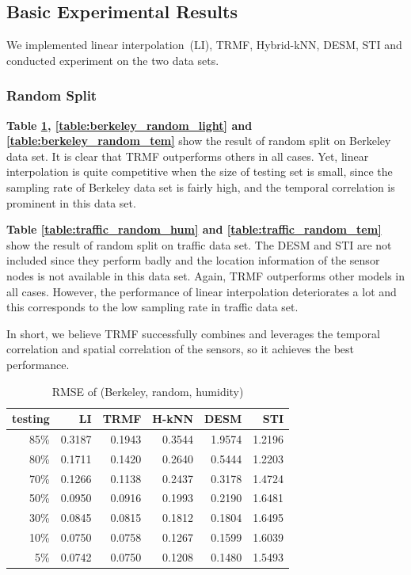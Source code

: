 \subsection{Basic Experimental Results} %

We implemented linear interpolation~(LI), TRMF, Hybrid-kNN, DESM, STI and conducted experiment on the two data sets.

\subsubsection{Random Split}
\textbf{Table \ref{table:berkeley_random_hum}, \ref{table:berkeley_random_light} and \ref{table:berkeley_random_tem}} show the result of random split on Berkeley data set. It is clear that TRMF outperforms others in all cases. Yet, linear interpolation is quite competitive when the size of testing set is small, since the sampling rate of Berkeley data set is fairly high, and the temporal correlation is prominent in this data set.  

\textbf{Table \ref{table:traffic_random_hum} and \ref{table:traffic_random_tem}} show the result of random split on traffic data set. The DESM and STI are not included since they perform badly and the location information of the sensor nodes is not available in this data set. Again, TRMF outperforms other models in all cases. However, the performance of linear interpolation deteriorates a lot and this corresponds to the low sampling rate in traffic data set. 

In short, we believe TRMF successfully combines and leverages the temporal correlation and spatial correlation of the sensors, so it achieves the best performance. %

\begin{table}[htbp]
\centering
\caption{RMSE of (Berkeley, random, humidity)}
\label{table:berkeley_random_hum}
\begin{tabular}{ r | r r r r r}
	testing	&LI	&TRMF	&H-kNN	&DESM	&STI\\ \hline
	85\%	&0.3187	&0.1943	&0.3544	&1.9574	&1.2196\\ 
	80\%	&0.1711	&0.1420	&0.2640	&0.5444	&1.2203\\
	70\%	&0.1266	&0.1138	&0.2437	&0.3178	&1.4724\\
	50\%	&0.0950	&0.0916	&0.1993	&0.2190	&1.6481\\
	30\%	&0.0845	&0.0815	&0.1812	&0.1804	&1.6495\\
	10\%	&0.0750	&0.0758	&0.1267	&0.1599	&1.6039\\
	 5\%	&0.0742	&0.0750	&0.1208	&0.1480	&1.5493
\end{tabular}
\end{table}

